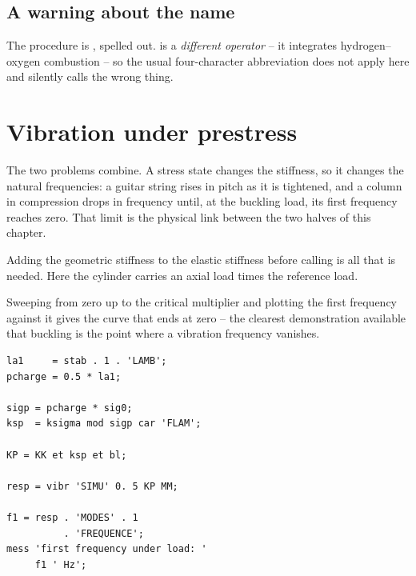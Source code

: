 \subsection*{A warning about the name}

%
%
The procedure is , spelled out.  is a \emph{different
operator} -- it integrates hydrogen--oxygen combustion -- so the usual
four-character abbreviation does not apply here and silently calls the wrong
thing.

\section{Vibration under prestress}

%
The two problems combine. A stress state changes the stiffness, so it changes
the natural frequencies: a guitar string rises in pitch as it is tightened,
and a column in compression drops in frequency until, at the buckling load,
its first frequency reaches zero. That limit is the physical link between the
two halves of this chapter.

\begin{castemcom}
Adding the geometric stiffness to the elastic stiffness before calling
 is all that is needed. Here the cylinder carries an axial load
 times the reference load.

Sweeping  from zero up to the critical multiplier and plotting
the first frequency against it gives the curve that ends at zero -- the
clearest demonstration available that buckling is the point where a vibration
frequency vanishes.
\end{castemcom}
\begin{castemlines}
\begin{verbatim}
la1     = stab . 1 . 'LAMB';
pcharge = 0.5 * la1;

sigp = pcharge * sig0;
ksp  = ksigma mod sigp car 'FLAM';

KP = KK et ksp et bl;

resp = vibr 'SIMU' 0. 5 KP MM;

f1 = resp . 'MODES' . 1
          . 'FREQUENCE';
mess 'first frequency under load: '
     f1 ' Hz';
\end{verbatim}
\end{castemlines}


